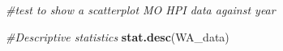 \documentclass[
]{article}
\newenvironment{Shaded}{\begin{snugshade}}{\end{snugshade}}
\newcommand{\CommentTok}[1]{\textcolor[rgb]{0.56,0.35,0.01}{\textit{#1}}}
\newcommand{\KeywordTok}[1]{\textcolor[rgb]{0.13,0.29,0.53}{\textbf{#1}}}
\newcommand{\NormalTok}[1]{#1}
\newcommand{\OperatorTok}[1]{\textcolor[rgb]{0.81,0.36,0.00}{\textbf{#1}}}
\newcommand{\StringTok}[1]{\textcolor[rgb]{0.31,0.60,0.02}{#1}}
\begin{document}
\begin{Shaded}
\begin{Highlighting}[]
\CommentTok{#test to show a scatterplot MO HPI data against year}
\end{Highlighting}
\end{Shaded}

\begin{Shaded}
\end{Shaded}

\begin{Shaded}
\begin{Highlighting}[]
\CommentTok{#Descriptive statistics}
\KeywordTok{stat.desc}\NormalTok{(WA_data)}
\end{Highlighting}
\end{Shaded}
\end{document}
